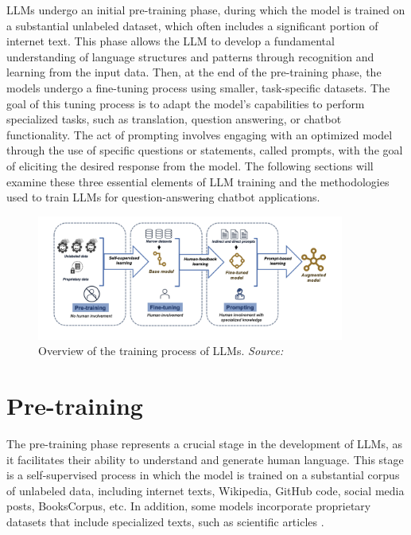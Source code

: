 LLMs undergo an initial pre-training phase, during which the model is trained on a substantial unlabeled dataset, which often includes a significant portion of internet text. This phase allows the LLM to develop a fundamental understanding of language structures and patterns through recognition and learning from the input data. Then, at the end of the pre-training phase, the models undergo a fine-tuning process using smaller, task-specific datasets. The goal of this tuning process is to adapt the model's capabilities to perform specialized tasks, such as translation, question answering, or chatbot functionality. The act of prompting involves engaging with an optimized model through the use of specific questions or statements, called prompts, with the goal of eliciting the desired response from the model. The following sections will examine these three essential elements of LLM training and the methodologies used to train LLMs for question-answering chatbot applications.

\begin{figure}[h!]
    \centering
    \includegraphics[width=0.9\textwidth]{images/llms/LLM-training-process.png}
    \caption{Overview of the training process of LLMs. \textit{Source:} \cite{omiye2023large}}
    \label{fig:training-process}
\end{figure}

\section{Pre-training}

The pre-training phase represents a crucial stage in the development of LLMs, as it facilitates their ability to understand and generate human language. This stage is a self-supervised process in which the model is trained on a substantial corpus of unlabeled data, including internet texts, Wikipedia, GitHub code, social media posts, BooksCorpus, etc. In addition, some models incorporate proprietary datasets that include specialized texts, such as scientific articles \cite{brown2020language, devlin2018bert}.

